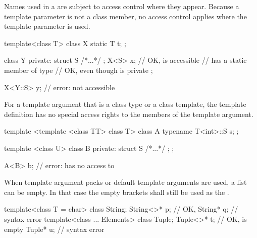 \documentclass{wg21}
\begin{document}
\pnum
\begin{note}
    Names used in a 
    are subject to access control where they appear.
    Because a template parameter is not a class member,
    no access control applies where the template parameter is used.
\end{note}
\begin{example}
    \begin{codeblock}
        template<class T> class X {
            static T t;
        };

        class Y {
            private:
            struct S { /*...*/ };
            X<S> x;           // OK,  is accessible
            //  has a static member of type 
            // OK, even though  is private
        };

        X<Y::S> y;          // error:  not accessible
    \end{codeblock}
\end{example}
For a template argument that is a class type or a class template,
the template definition has no special access rights
to the members of the template argument.
\begin{example}
    \begin{codeblock}
        template <template <class TT> class T> class A {
            typename T<int>::S s;
        };

        template <class U> class B {
            private:
            struct S { /*...*/ };
        };

        A<B> b;             // error:  has no access to 
    \end{codeblock}
\end{example}

\pnum
When template argument packs or default template arguments are used,
a  list can be empty.
In that case the empty
\tcode{<>}
brackets shall still be used as the
.
\begin{example}
    \begin{codeblock}
        template<class T = char> class String;
        String<>* p;                    // OK, 
        String* q;                      // syntax error
        template<class ... Elements> class Tuple;
        Tuple<>* t;                     // OK,  is empty
        Tuple* u;                       // syntax error
    \end{codeblock}
\end{example}
\end{document}
